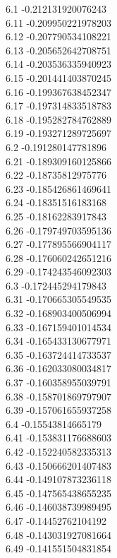 {6.1	-0.212131920076243\\
6.11	-0.209950221978203\\
6.12	-0.207790534108221\\
6.13	-0.205652642708751\\
6.14	-0.203536335940923\\
6.15	-0.201441403870245\\
6.16	-0.199367638452347\\
6.17	-0.197314833518783\\
6.18	-0.195282784762889\\
6.19	-0.193271289725697\\
6.2	-0.191280147781896\\
6.21	-0.189309160125866\\
6.22	-0.18735812975776\\
6.23	-0.185426861469641\\
6.24	-0.18351516183168\\
6.25	-0.18162283917843\\
6.26	-0.179749703595136\\
6.27	-0.177895566904117\\
6.28	-0.176060242651216\\
6.29	-0.174243546092303\\
6.3	-0.172445294179843\\
6.31	-0.170665305549535\\
6.32	-0.168903400506994\\
6.33	-0.167159401014534\\
6.34	-0.165433130677971\\
6.35	-0.163724414733537\\
6.36	-0.162033080034817\\
6.37	-0.160358955039791\\
6.38	-0.158701869797907\\
6.39	-0.157061655937258\\
6.4	-0.15543814665179\\
6.41	-0.153831176688603\\
6.42	-0.152240582335313\\
6.43	-0.150666201407483\\
6.44	-0.149107873236118\\
6.45	-0.147565438655235\\
6.46	-0.146038739989495\\
6.47	-0.14452762104192\\
6.48	-0.143031927081664\\
6.49	-0.141551504831854\\
}
